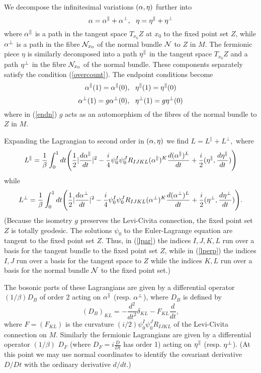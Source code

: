 \documentclass[12pt]{article}
\newcommand{\labell}[1] {\label{#1}}
\begin{document}
We decompose the infinitesimal variations
$({\alpha }, \eta)$  further into 
$$ {\alpha } = { {\alpha }}^{\parallel} + { {\alpha }}^{\perp}, ~~ \eta = { \eta}^{\parallel} + { \eta}^{\perp} $$
where ${ {\alpha }}^{\parallel}$ is a path in the tangent space $T_{x_0} Z$ at $x_0$
to the 
fixed point set $Z$, while
${ {\alpha }}^{\perp}$ is a path in the fibre ${\cal N}_{x_0} $  of the normal 
bundle ${\cal N}$ to $Z$ in $M$.
The fermionic piece $\eta$ is similarly decomposed into a path
${ \eta}^{\parallel}$ in the tangent space $T_{x_0} Z$ and a path 
${ \eta}^{\perp}$ in the fibre ${\cal N}_{x_0}$ of the normal bundle.
These components separately satisfy the condition 
(\ref{overcount}).
The endpoint conditions become
\begin{equation} \labell{endp}
\bosep(1) = \bosep(0), ~~ \etap(1) = \etap(0)
\end{equation}
\begin{equation} \labell{endn}
\bosen(1) = g \bosen(0), ~~ \etan(1) = g\etan(0)
\end{equation}
where in (\ref{endn}) $g$  acts as an automorphism
of the fibres of  the normal bundle to $Z$ in $M$.

\newcommand{\opbose}{{D_B}}
\newcommand{\opferm}{{D_F}}

Expanding the Lagrangian to second order in $({\alpha }, \eta)$ we find
$L = L^\parallel + L^\perp, $ where 
\begin{equation} \labell{lpar}
L^\parallel = \frac{1}{\beta} \int_{0}^1 dt 
\Biggl ( \frac{1}{2} |\frac{d\bosep}{dt}|^2 
- \frac{i}{4} \psi_0^I \psi_0^J R_{IJKL} (\bosep)^K \frac{d (\bosep)^L}{dt}
+ \frac{i}{2} 
(\etap, \frac{d\etap}{dt})  \Biggr )
\end{equation}
while 
\begin{equation} \labell{lperp}
L^\perp = \frac{1}{\beta} \int_{0}^1 dt 
\Biggl ( \frac{1}{2} |\frac{d\bosen}{dt}|^2 
- \frac{i}{4} \psi_0^I \psi_0^J R_{IJKL} (\bosen)^K \frac{d (\bosen)^L}{dt}
+ \frac{i}{2} 
(\etan, \frac{d \etan}{dt})  
\Biggr ).
\end{equation}
(Because the isometry $g$ preserves the Levi-Civita
connection, the fixed 
point set $Z$ is totally geodesic. The solutions 
$\psi_0 $ to the Euler-Lagrange equation are tangent
to the fixed point set $Z$.
Thus, in  (\ref{lpar}) the indices $I,J,K,L$ run over a basis for
the tangent bundle to the fixed point set $Z$, while in 
(\ref{lperp}) the indices $I,J$
 run over a basis for the tangent space to $Z$ 
while the indices $K,L$ run over a basis for the normal bundle ${\cal N}$ to 
the fixed point set.)

The bosonic parts of these
Lagrangians are given by a differential operator $(1/\beta)\opbose$ 
of order 2 acting on ${ {\alpha }}^{\parallel}$ (resp. ${ {\alpha }}^{\perp}$), where $\opbose$ is defined
by
\begin{equation} \labell{opbose}
(\opbose)_{KL}  =   - \frac{d^2}{dt^2} \delta_{KL} -  F_{KL} 
\frac{d}{dt}, 
\end{equation}
where $F = (F_{KL})$  is the curvature 
$(i/2)\psi_0^I \psi_0^J R_{IJKL} $ of the
Levi-Civita connection on $M$. 
Similarly the fermionic Lagrangians are given by a differential
operator $(1/\beta)$ $\opferm$ (where $\opferm= i\frac{D}{Dt}$
has order 1)
 acting on ${ \eta}^{\parallel} $ (resp. ${ \eta}^{\perp}$).
(At this point we may use normal coordinates to identify the 
covariant derivative $D/Dt$ with the ordinary
derivative $d/dt$.)
\end{document}
